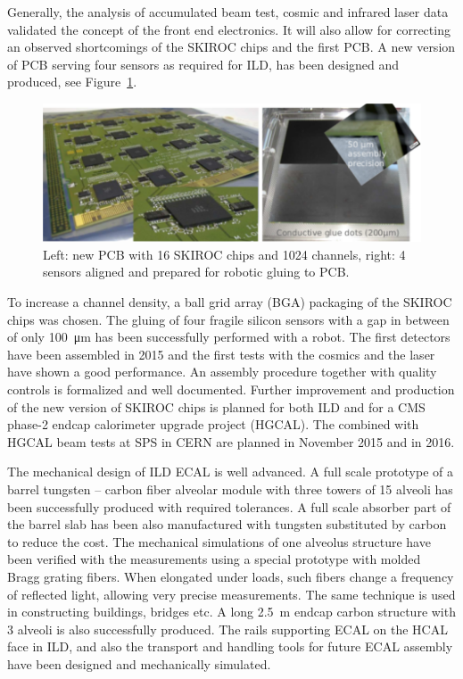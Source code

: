 Generally, the analysis of accumulated beam test, cosmic and infrared laser
data validated the concept of the front end electronics. It will also allow
for correcting an observed shortcomings of the SKIROC chips and the first
PCB. A new version of PCB serving four sensors as required for ILD, has been
designed and produced, see Figure~\ref{ild_siw_ecal_fev}.
\begin{figure}
\centering
\includegraphics[width=\textwidth]{Calorimeter/SiliconTungstenILD/FEV_gluing_photo.pdf}
\caption{Left: new PCB with 16 SKIROC chips and 1024 channels, right: 4 sensors
 aligned and prepared for robotic gluing to PCB.}
\label{ild_siw_ecal_fev}
\end{figure}
To increase a channel density, a ball grid array
(BGA) packaging of the SKIROC chips was chosen. The gluing of four fragile silicon
sensors with a gap in between of only \SI{100}{\micro\meter} has been successfully
performed with a robot. The first detectors have been assembled in 2015 and
the first tests with the cosmics and the laser have shown a good performance. An assembly
procedure together with quality controls is formalized and well documented.
Further improvement and production of the new version of SKIROC chips is planned
for both ILD and for a CMS phase-2 endcap calorimeter upgrade project
(HGCAL). The combined with HGCAL beam tests at SPS in CERN are planned in
November 2015 and in 2016.

The mechanical design of ILD ECAL is well advanced. A full scale prototype of
a barrel tungsten -- carbon fiber alveolar module with three towers of 15
alveoli has been successfully produced with required tolerances. A full scale
absorber part of the barrel slab has been also manufactured with tungsten
substituted by carbon to reduce the cost. The mechanical simulations of one
alveolus structure have been verified with the measurements using a special
prototype with molded Bragg grating fibers. When elongated under loads, such
fibers change a frequency of reflected light, allowing very precise
measurements. The same technique is used in constructing buildings, bridges
etc. A long \SI{2.5}{m} endcap carbon structure with 3 alveoli is also
successfully produced. The rails supporting ECAL on the HCAL face in ILD, and
also the transport and handling tools for future ECAL assembly have been
designed and mechanically simulated.

